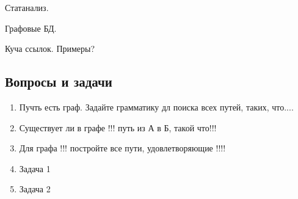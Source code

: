 Статанализ.

Графовые БД.

Куча ссылок. Примеры?

\subsection{Вопросы и задачи}
\begin{enumerate}
  \item Пучть есть граф. Задайте грамматику дл поиска всех путей, таких, что....
  \item Существует ли в графе !!! путь из А в Б, такой что!!!
  \item Для графа !!! постройте все пути, удовлетворяющие !!!!

  \item Задача 1
  \item Задача 2
\end{enumerate}
